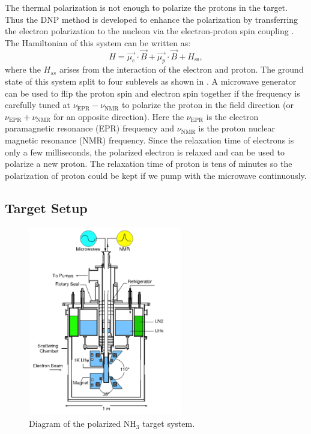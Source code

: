The thermal polarization is not enough to polarize the protons in the target. Thus the DNP method is developed to enhance the polarization by transferring the electron polarization to the nucleon via the electron-proton spin coupling \cite{Overhauser1953,Jeffries1957}. The Hamiltonian of this system can be written as:
\begin{equation} \label{C5S3SS1E3}
H = \vec{\mu_e}\cdot\vec{B}+\vec{\mu_p}\cdot\vec{B}+H_{\mathrm{ss}},
\end{equation}
where the $H_{ss}$ arises from the interaction of the electron and proton. The ground state of this system split to four sublevels as shown in . A microwave generator can be used to flip the proton spin and electron spin together if the frequency is carefully tuned at $\nu_{\mathrm{EPR}}-\nu_{\mathrm{NMR}}$ to polarize the proton in the field direction (or $\nu_{\mathrm{EPR}}+\nu_{\mathrm{NMR}}$ for an opposite direction). Here the $\nu_{\mathrm{EPR}}$ is the electron paramagnetic resonance (EPR) frequency and $\nu_{\mathrm{NMR}}$ is the proton nuclear magnetic resonance (NMR) frequency. Since the relaxation time of electrons is only a few milliseconds, the polarized electron is relaxed and can be used to polarize a new proton. The relaxation time of proton is tens of minutes so the polarization of proton could be kept if we pump with the microwave continuously.

\subsection{Target Setup}
\label{C5S3SS2}

\begin{figure}[b!]
  \centering
  \includegraphics[width=0.6\textwidth]{figs/target.png}
  \caption[Diagram of the polarized NH${}_3$ target system.]{Diagram of the polarized NH${}_3$ target system. \label{C5S3SS2F1}}
\end{figure}

